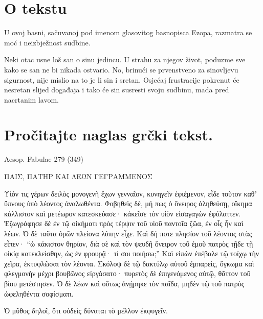 


\section*{O tekstu}

U ovoj basni, sačuvanoj pod imenom glasovitog basnopisca Ezopa, razmatra se moć i neizbježnost sudbine.

Neki otac usne loš san o sinu jedincu. U strahu za njegov život, poduzme sve kako se san ne bi nikada ostvario. No, brinući se prvenstveno za sinovljevu sigurnost, nije mislio na to je li sin i sretan. Osjećaj frustracije pokrenut će nesretan slijed događaja i tako će sin susresti svoju sudbinu, mada pred nacrtanim lavom.


\section*{Pročitajte naglas grčki tekst.}

Aesop. Fabulae 279 (349)


\medskip


{\large

\begin{greek}

\noindent ΠΑΙΣ, ΠΑΤΗΡ ΚΑΙ ΛΕΩΝ ΓΕΓΡΑΜΜΕΝΟΣ

\medskip

\noindent Υἱόν τις γέρων δειλὸς μονογενῆ ἔχων γενναῖον, κυνηγεῖν ἐφιέμενον, εἶδε τοῦτον καθʼ ὕπνους ὑπὸ λέοντος ἀναλωθέντα. Φοβηθεὶς δὲ, μή πως ὁ ὄνειρος ἀληθεύσῃ, οἴκημα κάλλιστον καὶ μετέωρον κατεσκεύασε· κἀκεῖσε τὸν υἱὸν εἰσαγαγὼν ἐφύλαττεν. Ἐζωγράφησε δὲ ἐν τῷ οἰκήματι πρὸς τέρψιν τοῦ υἱοῦ παντοῖα ζῶα, ἐν οἷς ἦν καὶ λέων. Ὁ δὲ ταῦτα ὁρῶν πλείονα λύπην εἶχε. Καὶ δή ποτε πλησίον τοῦ λέοντος στὰς εἶπεν· ``ὡ κάκιστον θηρίον, διὰ σὲ καὶ τὸν ψευδῆ ὄνειρον τοῦ ἐμοῦ πατρὸς τῇδε τῇ οἰκίᾳ κατεκλείσθην, ὡς ἐν φρουρᾷ· τί σοι ποιήσω;'' Καὶ εἰπὼν ἐπέβαλε τῷ τοίχῳ τὴν χεῖρα, ἐκτυφλῶσαι τὸν λέοντα. Σκόλοψ δὲ τῷ δακτύλῳ αὐτοῦ ἐμπαρεὶς, ὄγκωμα καὶ φλεγμονὴν μέχρι βουβῶνος εἰργάσατο· πυρετὸς δὲ ἐπιγενόμενος αὐτῷ, θᾶττον τοῦ βίου μετέστησεν. Ὁ δὲ λέων καὶ οὕτως ἀνῄρηκε τὸν παῖδα, μηδὲν τῷ τοῦ πατρὸς ὠφεληθέντα σοφίσματι.

Ὁ μῦθος δηλοῖ, ὅτι οὐδεὶς δύναται τὸ μέλλον ἐκφυγεῖν.

\end{greek}

}


